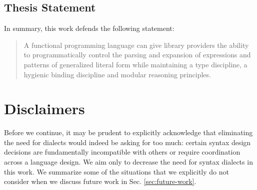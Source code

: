 

\subsection*{Thesis Statement}
In summary, this work defends the following statement:

\begin{quote}
A functional programming language can give library providers the ability to %
programmatically control the parsing and expansion of expressions and patterns of generalized literal form while maintaining a type discipline, a hygienic binding discipline and modular reasoning principles. %
\end{quote}
\section{Disclaimers}
Before we continue, it may be prudent to explicitly acknowledge that eliminating the need for dialects would indeed be asking for too much: certain syntax design decisions are fundamentally incompatible with others or require coordination across a language design. We aim only to decrease the need for syntax dialects in this work. We summarize some of the situations that we explicitly do not consider when we discuss future work in Sec. \ref{sec:future-work}. %

